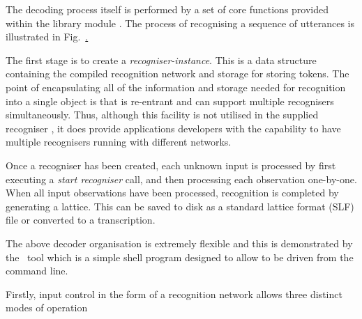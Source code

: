 The decoding process itself is performed by a set of core functions 
provided within the library module .  The process
of recognising a sequence of utterances is illustrated in 
Fig.~\href{f:decflow}.

The first stage is to create a \textit{recogniser-instance}.  This is
a data structure containing the compiled recognition network and
storage for storing tokens.  The point of encapsulating all of the
information and storage needed for recognition into a single object is
that  is re-entrant and can support 
multiple recognisers
simultaneously.  Thus, although this facility is not utilised in the
supplied recogniser , it does provide applications
developers with the capability to have multiple recognisers running
with different networks.

Once a recogniser has been created, each unknown input is 
processed by first executing a \textit{start recogniser} call, and then
processing each observation one-by-one.  When all input observations
have been processed, recognition is completed by generating a lattice.
This can be saved to disk as a standard lattice format (SLF) file or
converted to a transcription.

The above decoder organisation is extremely flexible and this is
demonstrated by the \HTK\ tool  which is a simple 
shell program designed to allow  to be driven from
the command line.  

Firstly, input
control in the form of a recognition network allows three distinct modes
of operation

